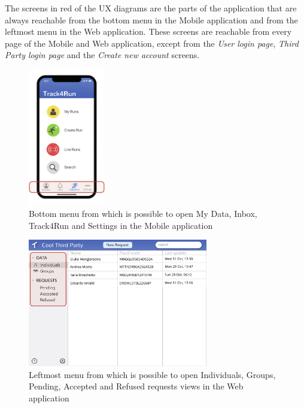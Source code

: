 The screens in red of the UX diagrams are the parts of the application that are always reachable from the bottom menu in the Mobile application and from the leftmost menu in the Web application. These screens are reachable from every page of the Mobile and Web application, except from the \textit{User login page}, \textit{Third Party login page} and the \textit{Create new account} screens.

\begin{figure}[H]

    \centering
    \includegraphics[width=0.3\textwidth]{./Pictures/ux-highlight-mobile.jpeg}
    \caption{Bottom menu from which is possible to open My Data, Inbox, Track4Run and Settings in the Mobile application}
    
\end{figure}

\begin{figure}[H]

    \centering
    \includegraphics[width=0.7\textwidth]{./Pictures/ux-highlight-web.jpeg}
    \caption{Leftmost menu from which is possible to open Individuals, Groups, Pending, Accepted and Refused requests views in the Web application}
    
\end{figure}